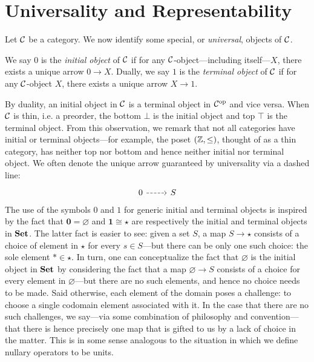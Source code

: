 \section{Universality and Representability}

Let $\mathcal{C}$ be a category. We now identify some special, or \emph{universal}, objects of $\mathcal{C}$. 

\begin{dfn}
We say $0$ is the \emph{initial object} of $\mathcal{C}$ if for any $\mathcal{C}$-object---including itself---$X$, there exists a unique arrow $0\to X$. Dually, we say $1$ is the \emph{terminal object} of $\mathcal{C}$ if for any $\mathcal{C}$-object $X$, there exists a unique arrow $X\to 1$.
\end{dfn}

By duality, an initial object in $\mathcal{C}$ is a terminal object in $\mathcal{C}^{\text{op}}$ and vice versa. When $\mathcal{C}$ is thin, i.e. a preorder, the bottom $\bot$ is the initial object and top $\top$ is the terminal object. From this observation, we remark that not all categories have initial or terminal objects---for example, the poset $(\mathbb Z,\leq)$, thought of as a thin category, has neither top nor bottom and hence neither initial nor terminal object. We often denote the unique arrow guaranteed by universality via a dashed line:
\[
\begin{tikzcd}
0 \arrow[r,dashed] & S
\end{tikzcd}
\]
The use of the symbols $0$ and $1$ for generic initial and terminal objects is inspired by the fact that $\mathbf{0}=\varnothing$ and $\mathbf{1}\cong\star$ are respectively the initial and terminal objects in $\mathbf{Set}$. The latter fact is easier to see: given a set $S$, a map $S\to\star$ consists of a choice of element in $\star$ for every $s\in S$---but there can be only one such choice: the sole element $*\in\star$. In turn, one can conceptualize the fact that $\varnothing$ is the initial object in $\mathbf{Set}$ by considering the fact that a map $\varnothing\to S$ consists of a choice for every element in $\varnothing$---but there are no such elements, and hence no choice needs to be made. Said otherwise, each element of the domain poses a challenge: to choose a single codomain element associated with it. In the case that there are no such challenges, we say---via some combination of philosophy and convention---that there is hence precisely one map that is gifted to us by a lack of choice in the matter. This is in some sense analogous to the situation in which we define nullary operators to be units.


